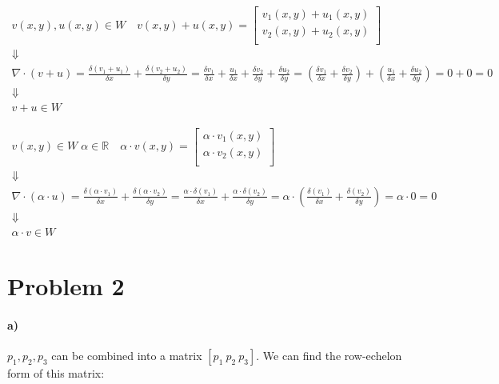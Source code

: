 \documentclass[10pt,letter]{article}
\newcommand{\R}{\mathbb{R}}
\begin{document}
\begin{gather*}
v(x,y), u(x,y) \in W \quad
v(x,y) + u(x,y) =
\left[ {\begin{array}{c}
 v_1(x,y) + u_1(x,y) \\
 v_2(x,y) + u_2(x,y) \\
\end{array} } \right]
\\ \Downarrow \\
\nabla \cdot (v + u)
= \frac{\delta (v_1 + u_1)}{\delta x} + \frac{\delta (v_2 + u_2)}{\delta y}
= \frac{\delta v_1}{\delta x} + \frac{u_1}{\delta x} + \frac{\delta v_2}{\delta y} + \frac{\delta u_2}{\delta y}
= (\frac{\delta v_1}{\delta x} + \frac{\delta v_2}{\delta y}) + (\frac{u_1}{\delta x} + \frac{\delta u_2}{\delta y})
= 0 + 0 = 0
\\ \Downarrow \\
v+u \in W
\end{gather*}

\begin{gather*}
v(x,y) \in W \; \alpha \in \R \quad
\alpha \cdot v(x,y) =
\left[ {\begin{array}{c}
 \alpha \cdot v_1(x,y) \\
 \alpha \cdot v_2(x,y) \\
\end{array} } \right]
\\ \Downarrow \\
\nabla \cdot (\alpha \cdot u)
= \frac{\delta (\alpha \cdot v_1)}{\delta x} + \frac{\delta (\alpha \cdot v_2)}{\delta y}
= \frac{\alpha \cdot \delta (v_1)}{\delta x} + \frac{\alpha \cdot \delta (v_2)}{\delta y}
= \alpha \cdot (\frac{\delta (v_1)}{\delta x} + \frac{\delta (v_2)}{\delta y})
= \alpha \cdot 0 = 0
\\ \Downarrow \\
\alpha \cdot v \in W
\end{gather*}

\section*{Problem 2}

\paragraph{a)} $p_1, p_2, p_3$ can be combined into a matrix $\left[p_1\ p_2\ p_3\right]$. We can find the row-echelon form of this matrix:
\end{document}
